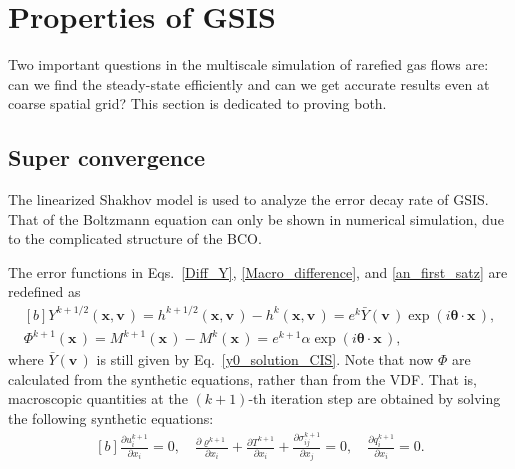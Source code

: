\section{Properties of GSIS}\label{secIII}

Two important questions in the multiscale simulation of rarefied gas flows are: can we find the steady-state efficiently and can we get accurate results even at coarse spatial grid? This section is dedicated to proving both. 

\subsection{Super convergence}

The linearized Shakhov model is used to analyze the error decay rate of GSIS. That of the Boltzmann equation can only be shown in numerical simulation, due to the complicated structure of the BCO.  

The error functions in Eqs.~\eqref{Diff_Y}, \eqref{Macro_difference}, and \eqref{an_first_satz} are redefined as
\begin{equation}\label{Y_ansatz2} 
\begin{aligned}[b]
Y^{k+1/2}(\bm{x},\bm{{v}}\,)=h^{k+1/2}(\bm{x},\bm{{v}}\,)-h^{k}(\bm{x},\bm{{v}}\,)=e^{k}\bar{Y}(\bm{{v}}\,)\exp(i\bm{\theta}\cdot{\bm{x}}\,),\\
\Phi^{k+1}(\bm{x}\,)=M^{k+1}(\bm{x}\,)-M^{k}(\bm{x}\,)=e^{k+1}\alpha\exp(i\bm{\theta}\cdot{\bm{x}}\,),
\end{aligned}
\end{equation}
where $\bar{Y}(\bm{{v}}\,)$ is still given by Eq.~\eqref{y0_solution_CIS}. Note that now $\Phi$ are calculated from the synthetic equations, rather than from the VDF. 
That is, macroscopic quantities at the $(k+1)$-th iteration step are obtained by solving the following synthetic equations:
\begin{equation}\label{eq123_lin}
\begin{aligned}[b]
\frac{\partial {u^{k+1}_i}}{\partial{x_i}}=0,\quad
\frac{\partial {\varrho^{k+1}}}{\partial{x_i}}+\frac{\partial {T^{k+1}}}{\partial{x_i}}+\frac{\partial {{\sigma^{k+1}_{ij}}}}{\partial{x_j}}=0, \quad
\frac{\partial {{q^{k+1}_{i}}}}{\partial{x_i}}=0.	
\end{aligned}
\end{equation}


